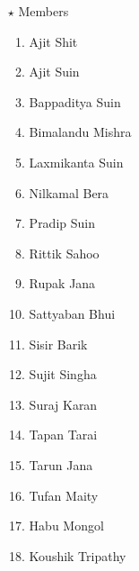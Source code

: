 \begin{adjustwidth}{15mm}{15mm}
\begin{itemize}
        
    \item[$\star$] Members	
    \begin{multicols}{3}
        \begin{enumerate}
            \item Ajit Shit
            \item Ajit Suin
            \item Bappaditya Suin
            \item Bimalandu Mishra
            \item Laxmikanta Suin
            \item Nilkamal Bera
            \item Pradip Suin
            \item Rittik Sahoo
            \item Rupak Jana
            \item Sattyaban Bhui
            \item Sisir Barik
            \item Sujit Singha
            \item Suraj Karan
            \item Tapan Tarai
            \item Tarun Jana
            \item Tufan Maity
            \item Habu Mongol 
            \item Koushik Tripathy
        \end{enumerate}
    \end{multicols}
    \end{itemize}
    
    \end{adjustwidth}